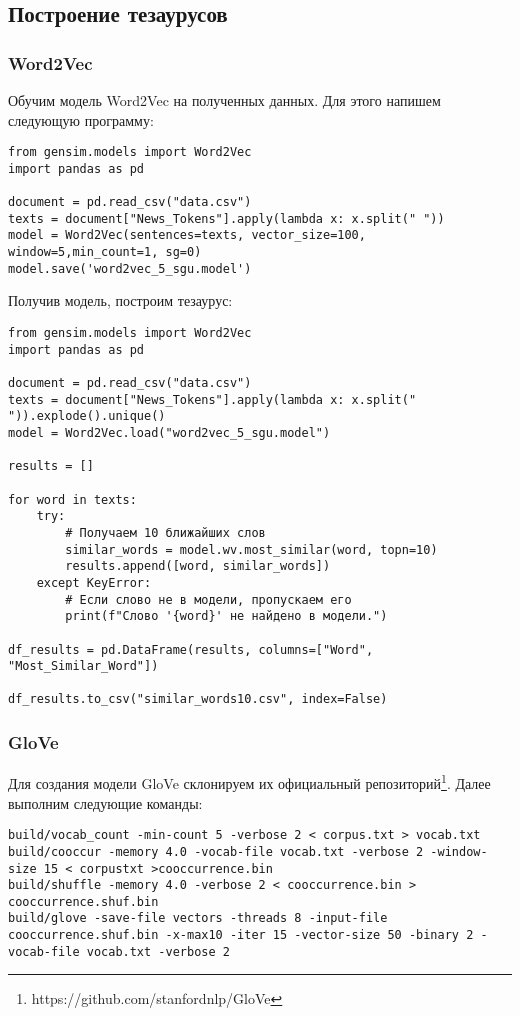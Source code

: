 \documentclass[coursework]{SCWorks}
\begin{document}
\subsection{Построение тезаурусов}
\subsubsection{Word2Vec}
Обучим модель Word2Vec на полученных данных. Для этого напишем следующую программу:
\begin{verbatim}
from gensim.models import Word2Vec
import pandas as pd

document = pd.read_csv("data.csv")
texts = document["News_Tokens"].apply(lambda x: x.split(" "))
model = Word2Vec(sentences=texts, vector_size=100, window=5,min_count=1, sg=0)
model.save('word2vec_5_sgu.model')
\end{verbatim}

Получив модель, построим тезаурус:
\begin{verbatim}
from gensim.models import Word2Vec
import pandas as pd

document = pd.read_csv("data.csv")
texts = document["News_Tokens"].apply(lambda x: x.split(" ")).explode().unique()
model = Word2Vec.load("word2vec_5_sgu.model")

results = []

for word in texts:
    try:
        # Получаем 10 ближайших слов
        similar_words = model.wv.most_similar(word, topn=10)
        results.append([word, similar_words])
    except KeyError:
        # Если слово не в модели, пропускаем его
        print(f"Слово '{word}' не найдено в модели.")

df_results = pd.DataFrame(results, columns=["Word", "Most_Similar_Word"])

df_results.to_csv("similar_words10.csv", index=False)
\end{verbatim}
\subsubsection{GloVe}
Для создания модели GloVe склонируем их официальный репозиторий\footnote{https://github.com/stanfordnlp/GloVe}. Далее выполним следующие команды:
\begin{verbatim}
build/vocab_count -min-count 5 -verbose 2 < corpus.txt > vocab.txt
build/cooccur -memory 4.0 -vocab-file vocab.txt -verbose 2 -window-size 15 < corpustxt >cooccurrence.bin
build/shuffle -memory 4.0 -verbose 2 < cooccurrence.bin > cooccurrence.shuf.bin
build/glove -save-file vectors -threads 8 -input-file cooccurrence.shuf.bin -x-max10 -iter 15 -vector-size 50 -binary 2 -vocab-file vocab.txt -verbose 2
\end{verbatim}
\end{document}
